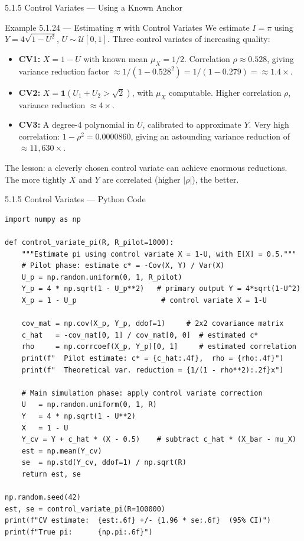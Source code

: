 \documentclass[aspectratio=169,10pt]{beamer}
\begin{document}
\begin{frame}[allowframebreaks]{5.1.5 Control Variates --- Using a Known Anchor}
\begin{exampleblock}{Example 5.1.24 --- Estimating $\pi$ with Control Variates}
  We estimate $I = \pi$ using $Y = 4\sqrt{1-U^2}$, $U \sim \mathcal{U}[0,1]$.
  Three control variates of increasing quality:
  \begin{itemize}
    \item \textbf{CV1:} $X = 1 - U$ with known mean $\mu_X = 1/2$.
          Correlation $\rho \approx 0.528$, giving variance reduction factor
          $\approx 1/(1-0.528^2) = 1/(1-0.279) = \approx 1.4\times$.
    \item \textbf{CV2:} $X = \mathbf{1}(U_1 + U_2 > \sqrt{2})$, with $\mu_X$ computable.
          Higher correlation $\rho$, variance reduction $\approx 4\times$.
    \item \textbf{CV3:} A degree-4 polynomial in $U$, calibrated to approximate $Y$.
          Very high correlation: $1-\rho^2 = 0.0000860$, giving an astounding
          variance reduction of $\approx 11{,}630\times$.
  \end{itemize}
  The lesson: a cleverly chosen control variate can achieve enormous reductions.
  The more tightly $X$ and $Y$ are correlated (higher $|\rho|$), the better.
\end{exampleblock}

\end{frame}

\begin{frame}[fragile]{5.1.5 Control Variates --- Python Code}
\begin{lstlisting}[style=python]
import numpy as np

def control_variate_pi(R, R_pilot=1000):
    """Estimate pi using control variate X = 1-U, with E[X] = 0.5."""
    # Pilot phase: estimate c* = -Cov(X, Y) / Var(X)
    U_p = np.random.uniform(0, 1, R_pilot)
    Y_p = 4 * np.sqrt(1 - U_p**2)   # primary output Y = 4*sqrt(1-U^2)
    X_p = 1 - U_p                    # control variate X = 1-U

    cov_mat = np.cov(X_p, Y_p, ddof=1)     # 2x2 covariance matrix
    c_hat   = -cov_mat[0, 1] / cov_mat[0, 0]  # estimated c*
    rho     = np.corrcoef(X_p, Y_p)[0, 1]     # estimated correlation
    print(f"  Pilot estimate: c* = {c_hat:.4f},  rho = {rho:.4f}")
    print(f"  Theoretical var. reduction = {1/(1 - rho**2):.2f}x")

    # Main simulation phase: apply control variate correction
    U   = np.random.uniform(0, 1, R)
    Y   = 4 * np.sqrt(1 - U**2)
    X   = 1 - U
    Y_cv = Y + c_hat * (X - 0.5)    # subtract c_hat * (X_bar - mu_X)
    est = np.mean(Y_cv)
    se  = np.std(Y_cv, ddof=1) / np.sqrt(R)
    return est, se

np.random.seed(42)
est, se = control_variate_pi(R=100000)
print(f"CV estimate:  {est:.6f} +/- {1.96 * se:.6f}  (95% CI)")
print(f"True pi:      {np.pi:.6f}")
\end{lstlisting}
\end{frame}
\end{document}
